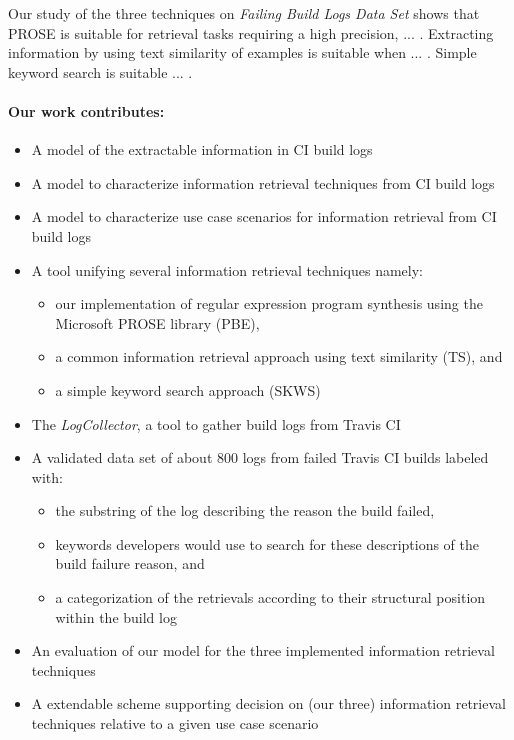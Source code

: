 \documentclass[\myrootdir/main.tex]{subfiles}
\begin{document}
Our study of the three techniques on \emph{Failing Build Logs Data Set} shows that PROSE is suitable for retrieval tasks requiring a high precision, ... . Extracting information by using text similarity of examples is suitable when ... . Simple keyword search is suitable ... .


\paragraph{Our work contributes:}
\begin{itemize}
  \item A model of the extractable information in CI build logs
  \item A model to characterize information retrieval techniques from CI build logs
  \item A model to characterize use case scenarios for information retrieval from CI build logs
  \item A tool unifying several information retrieval techniques namely:
        \begin{itemize}
          \item our implementation of regular expression program synthesis using the Microsoft PROSE library (PBE),
          \item a common information retrieval approach using text similarity (TS), and
          \item a simple keyword search approach (SKWS)
        \end{itemize}
  \item The \emph{LogCollector}, a tool to gather build logs from Travis CI
  \item A validated data set of about 800 logs from failed Travis CI builds labeled with:
        \begin{itemize}
          \item the substring of the log describing the reason the build failed,
          \item keywords developers would use to search for these descriptions of the build failure reason, and
          \item a categorization of the retrievals according to their structural position within the build log
        \end{itemize}
  \item An evaluation of our model for the three implemented information retrieval techniques 
  \item A extendable scheme supporting decision on (our three) information retrieval techniques relative to a given use case scenario
\end{itemize}
\end{document}
